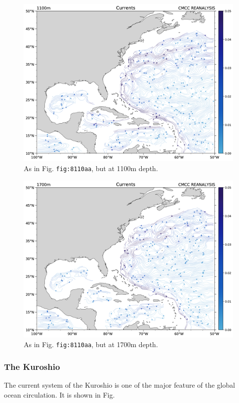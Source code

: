 \begin{figure}
	\centering
	\includegraphics[width = .7 \textwidth]{figs/GD/UVstream1100mATLCARIB.png}
	\caption{As in Fig. \texttt{fig:8110aa}, but at 1100m depth.}
\end{figure}

\begin{figure}
	\centering
	\includegraphics[width = .7 \textwidth]{figs/GD/UVstream1700mATLCARIB.png}
	\caption{As in Fig. \texttt{fig:8110aa}, but at 1700m depth.}
\end{figure}

\subsubsection{The Kuroshio}\label{the-kuroshio}

The current system of the Kuroshio is one of the major feature of the
global ocean circulation. It is shown in Fig.

